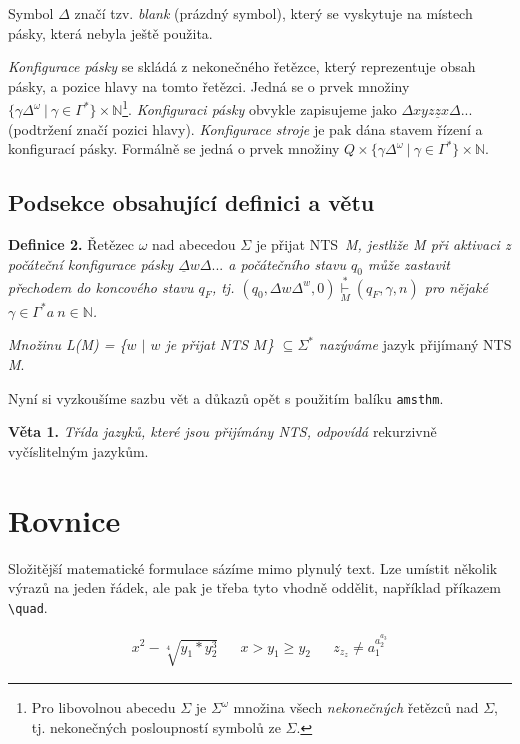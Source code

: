 \documentclass[a4paper, 11pt]{article}
\begin{document}
Symbol $\Delta$ značí tzv. \emph{blank} (prázdný symbol), který se vyskytuje na místech pásky, která nebyla ještě použita.

\emph{Konfigurace pásky} se skládá z nekonečného řetězce, který reprezentuje obsah pásky, a pozice hlavy na tomto řetězci. Jedná se o prvek množiny $\{\gamma\Delta^\omega\:|\:\gamma \in \Gamma^*\} \times \mathbb{N}$\footnote{Pro libovolnou abecedu $\Sigma$ je $\Sigma^\omega$ množina všech \emph{nekonečných} řetězců nad $\Sigma$, tj. nekonečných posloupností symbolů ze $\Sigma$.}.
\emph{Konfiguraci pásky} obvykle zapisujeme jako $\Delta xyz\underline{z}x\Delta...$ (podtržení značí pozici hlavy).
\emph{Konfigurace stroje} je pak dána stavem řízení a konfigurací pásky. Formálně se jedná o prvek množiny $Q \times \{\gamma\Delta^\omega\:|\:\gamma\in\Gamma^*\} \times \mathbb{N}$.

\subsection{Podsekce obsahující definici a větu}
\setlength{\emergencystretch}{10pt}
\noindent\textbf{Definice 2.} Řetězec $\omega$ nad abecedou $\Sigma$ je přijat NTS~\emph{M, jestliže M při aktivaci z počáteční konfigurace pásky $\underline{\Delta}w\Delta...$ a počátečního stavu $q_0$ může zastavit přechodem do koncového stavu $q_F$, tj. $(q_0,\Delta w\Delta^w,0) \underset{M}{\overset{*}{\vdash}} (q_F,\gamma,n)$ pro nějaké $\gamma\in\Gamma^* a\:n\in\mathbb{N}$. }

\emph{Množinu L(M) = \{$w$ $|$ $w$ je přijat NTS $M$\} $\subseteq\Sigma^*$ nazýváme} jazyk přijímaný NTS \emph{M}.
\medskip

Nyní si vyzkoušíme sazbu vět a důkazů opět s použitím balíku \texttt{amsthm}.
\medskip

\noindent\textbf{Věta 1.} \emph{Třída jazyků, které jsou přijímány NTS, odpovídá} rekurzivně vyčíslitelným jazykům.

\section{Rovnice}
Složitější matematické formulace sázíme mimo plynulý
text. Lze umístit několik výrazů na jeden řádek, ale pak je
třeba tyto vhodně oddělit, například příkazem \verb|\quad|.

\begin{align*}
    &&&& x^2-\sqrt[4]{y_1 * y_2^3} && x > y_1 \geq y_2 && z_{z_z}\neq a_1^{a_2^{a_3}} &&&&
\end{align*}
\end{document}

